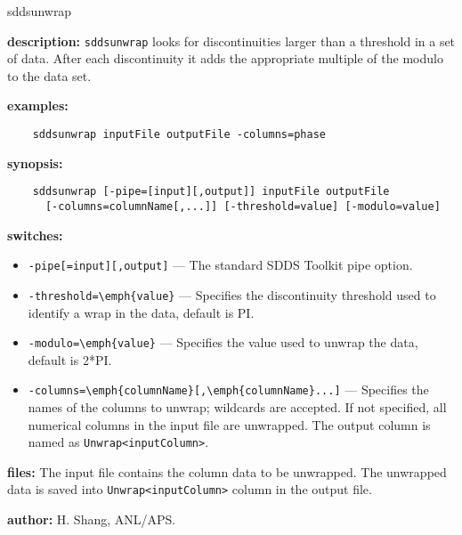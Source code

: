 \begin{sddsprog}{sddsunwrap}
  \item \textbf{description:}
    \verb|sddsunwrap| looks for discontinuities larger than a threshold in a set of data.
    After each discontinuity it adds the appropriate multiple of the modulo to the data set.
  \item \textbf{examples:}
    \begin{verbatim}
    sddsunwrap inputFile outputFile -columns=phase
    \end{verbatim}
  \item \textbf{synopsis:}
    \begin{verbatim}
    sddsunwrap [-pipe=[input][,output]] inputFile outputFile
      [-columns=columnName[,...]] [-threshold=value] [-modulo=value]
    \end{verbatim}
  \item \textbf{switches:}
    \begin{itemize}
      \item \verb|-pipe[=input][,output]| --- The standard SDDS Toolkit pipe option.
      \item \verb|-threshold=\emph{value}| --- Specifies the discontinuity threshold used to identify a wrap in the data, default is PI.
      \item \verb|-modulo=\emph{value}| --- Specifies the value used to unwrap the data, default is 2*PI.
      \item \verb|-columns=\emph{columnName}[,\emph{columnName}...]| --- Specifies the names of the columns to unwrap; wildcards are accepted. If not specified, all numerical columns in the input file are unwrapped. The output column is named as \verb|Unwrap<inputColumn>|.
    \end{itemize}
  \item \textbf{files:}
    The input file contains the column data to be unwrapped. The unwrapped data is saved into \verb|Unwrap<inputColumn>| column in the output file.
  \item \textbf{author:} H. Shang, ANL/APS.
\end{sddsprog}


